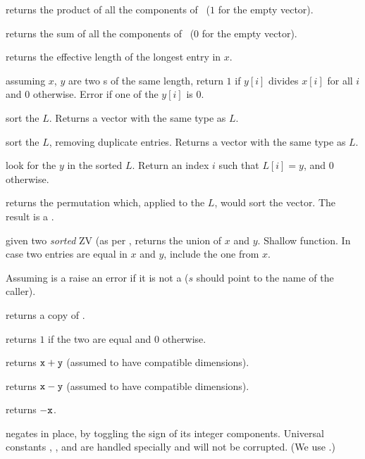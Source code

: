  returns the product of all the components
of~ ($1$ for the empty vector).

 returns the sum of all the components
of~ ($0$ for the empty vector).

 returns the effective length of the longest
entry in $x$.

 assuming $x$, $y$ are two s of the same
length, return $1$ if $y[i]$ divides $x[i]$ for all $i$ and $0$ otherwise.
Error if one of the $y[i]$ is $0$.

 sort the  $L$.
Returns a vector with the same type as $L$.

 sort the  $L$, removing duplicate
entries. Returns a vector with the same type as $L$.

 look for the  $y$ in the sorted
 $L$. Return an index $i$ such that $L[i] = y$, and  $0$ otherwise.

 returns the permutation which, applied to the
 $L$, would sort the vector. The result is a .

 given two \emph{sorted} ZV (as per
, returns the union of $x$ and $y$. Shallow function. In case two
entries are equal in $x$ and $y$,  include the one from $x$.


 Assuming  is a 
raise an error if it is not a  ($s$ should point to the name of the
caller).

 returns a copy of .

 returns $1$ if the two  are equal
and $0$ otherwise.

 returns ${\tt x} + {\tt y}$ (assumed to have
compatible dimensions).

 returns ${\tt x} - {\tt y}$ (assumed to have
compatible dimensions).

 returns $-{\tt x}$.

 negates  in place, by toggling the
sign of its integer components. Universal constants ,
,  and  are handled specially and will
not be corrupted. (We use .)

